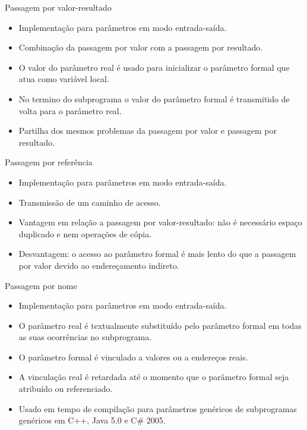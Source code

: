 \begin{frame}[fragile]{Passagem por valor-resultado}
	\begin{itemize}
	  \item Implementação para parâmetros em modo entrada-saída.
	  \item Combinação da passagem por valor com a passagem por resultado.
	  \item O valor do parâmetro real é usado para inicializar o parâmetro formal que atua como variável local. 
	  \item No termino do subprograma o valor do parâmetro formal é transmitido de volta para o parâmetro real.
	  \item Partilha dos mesmos problemas da passagem por valor e passagem por resultado.
	\end{itemize}
\end{frame}

\begin{frame}[fragile]{Passagem por referência}
	\begin{itemize}
	  \item Implementação para parâmetros em modo entrada-saída.
	  \item Transmissão de um caminho de acesso.
	  \item Vantagem em relação a passagem por valor-resultado: não é necessário espaço duplicado e nem operações de cópia.
	  \item  Desvantagem: o acesso ao parâmetro formal é mais lento do que a passagem por valor devido ao endereçamento indireto.
	\end{itemize}
\end{frame}

\begin{frame}[fragile]{Passagem por nome}
	\begin{itemize}
	  \item Implementação para parâmetros em modo entrada-saída.
	  \item O parâmetro real é textualmente substituído pelo parâmetro formal em todas as suas ocorrências no subprograma.
	  \item O parâmetro formal é vinculado a valores ou a endereços reais.
	  \item A vinculação real é retardada até o momento que o parâmetro formal seja atribuído ou referenciado.
	  \item Usado em tempo de compilação para parâmetros genéricos de subprogramas genéricos em C++, Java 5.0 e C\# 2005.
	\end{itemize}
\end{frame}

